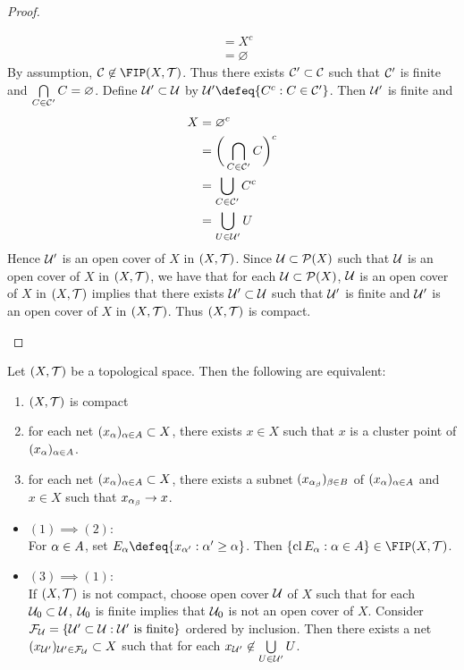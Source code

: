 \documentclass{book}
\begin{document}
\begin{proof}
\begin{itemize}
\begin{align*}
				& = X^c \\
				& = \varnothing
			\end{align*}  
			By assumption, $\MC \not \in \FIP(X, \MT)$. Thus there exists $\mathcal{C}' \subset \mathcal{C}$ such that $\mathcal{C}'$ is finite and $\bigcap\limits_{C \in \mathcal{C}'} C = \varnothing$. Define $\mathcal{U}' \subset \mathcal{U}$ by $\MU' \defeq \{C^c: C \in \MC' \}$. Then $\mathcal{U}'$ is finite and 
			\begin{align*}
				X
				& = \varnothing^c \\
				& = \bigg( \bigcap_{C \in \mathcal{C}'} C \bigg)^c \\
				& = \bigcup_{C \in \mathcal{C}'} C^c \\
				& = \bigcup_{U \in \mathcal{U}'} U \\
			\end{align*}
			Hence $\mathcal{U}'$ is an open cover of $X$ in $(X, \mathcal{T})$. Since $\mathcal{U} \subset \mathcal{P}(X)$ such that $\mathcal{U}$ is an open cover of $X$ in $(X, \mathcal{T})$, we have that for each $\mathcal{U} \subset \mathcal{P}(X)$, $\mathcal{U}$ is an open cover of $X$ in $(X, \mathcal{T})$ implies that there exists $\mathcal{U}' \subset \mathcal{U}$ such that $\mathcal{U}'$ is finite and $\mathcal{U}'$ is an open cover of $X$ in $(X, \mathcal{T})$. Thus $(X, \mathcal{T})$ is compact. 
			\end{itemize}
	\end{proof}

	\begin{ex} 
		Let $(X, \mathcal{T})$ be a topological space. Then the following are equivalent:
		\begin{enumerate}
			\item $(X, \mathcal{T})$ is compact
			\item for each net $(x_{\alpha})_{\alpha \in A} \subset X$, there exists $x \in X$ such that $x$ is a cluster point of $(x_{\alpha})_{\alpha \in A}$.
			\item for each net $(x_{\alpha})_{\alpha \in A} \subset X$, there exists a subnet $(x_{\alpha_{\beta}})_{\beta \in B}$ of $(x_{\alpha})_{\alpha \in A}$ and $x \in X$ such that $x_{\alpha_{\beta}} \rightarrow x$. \\
		\end{enumerate} 
		\begin{itemize}
			\item $(1) \implies (2)$: \\
			For $\alpha \in A$, set $E_{\al} \defeq \{x_{\al'}: \al' \geq \al \}$. Then $\{\cl E_{\al}: \al \in A\} \in \FIP(X, \MT)$.  
			\item $(3) \implies (1)$: \\
			If $(X, \mathcal{T})$ is not compact, choose open cover $\mathcal{U}$ of $X$ such that for each $\mathcal{U}_0 \subset \mathcal{U}$, $\mathcal{U}_0$ is finite implies that $\mathcal{U}_0$ is not an open cover of $X$. Consider $\mathcal{F}_{\mathcal{U}} = \{\mathcal{U}' \subset \mathcal{U}: \mathcal{U}' \text{ is finite}\}$ ordered by inclusion. Then there exists a net $(x_{\mathcal{U}'})_{\mathcal{U}' \in \mathcal{F}_{\mathcal{U}}} \subset X$ such that for each $x_{\mathcal{U}'} \not \in  \bigcup\limits_{U \in \mathcal{U}'} U$. 
		\end{itemize}
	\end{ex}
	
\end{document}
